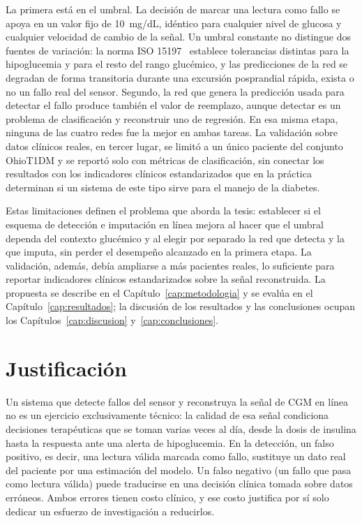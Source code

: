 \documentclass{report}
\begin{document}
La primera está en el umbral. La decisión de marcar una lectura como fallo se apoya en un valor fijo de 10~mg/dL, idéntico para cualquier nivel de glucosa y cualquier velocidad de cambio de la señal. Un umbral constante no distingue dos fuentes de variación: la norma ISO 15197~\cite{iso15197_2013} establece tolerancias distintas para la hipoglucemia y para el resto del rango glucémico, y las predicciones de la red se degradan de forma transitoria durante una excursión posprandial rápida, exista o no un fallo real del sensor. Segundo, la red que genera la predicción usada para detectar el fallo produce también el valor de reemplazo, aunque detectar es un problema de clasificación y reconstruir uno de regresión. En esa misma etapa, ninguna de las cuatro redes fue la mejor en ambas tareas. La validación sobre datos clínicos reales, en tercer lugar, se limitó a un único paciente del conjunto OhioT1DM y se reportó solo con métricas de clasificación, sin conectar los resultados con los indicadores clínicos estandarizados que en la práctica determinan si un sistema de este tipo sirve para el manejo de la diabetes.

Estas limitaciones definen el problema que aborda la tesis: establecer si el esquema de detección e imputación en línea mejora al hacer que el umbral dependa del contexto glucémico y al elegir por separado la red que detecta y la que imputa, sin perder el desempeño alcanzado en la primera etapa. La validación, además, debía ampliarse a más pacientes reales, lo suficiente para reportar indicadores clínicos estandarizados sobre la señal reconstruida. La propuesta se describe en el Capítulo~\ref{cap:metodologia} y se evalúa en el Capítulo~\ref{cap:resultados}; la discusión de los resultados y las conclusiones ocupan los Capítulos~\ref{cap:discusion} y~\ref{cap:conclusiones}.

\section{Justificación}
\label{sec:justificacion}

Un sistema que detecte fallos del sensor y reconstruya la señal de CGM en línea no es un ejercicio exclusivamente técnico: la calidad de esa señal condiciona decisiones terapéuticas que se toman varias veces al día, desde la dosis de insulina hasta la respuesta ante una alerta de hipoglucemia. En la detección, un falso positivo, es decir, una lectura válida marcada como fallo, sustituye un dato real del paciente por una estimación del modelo. Un falso negativo (un fallo que pasa como lectura válida) puede traducirse en una decisión clínica tomada sobre datos erróneos. Ambos errores tienen costo clínico, y ese costo justifica por sí solo dedicar un esfuerzo de investigación a reducirlos.
\end{document}
